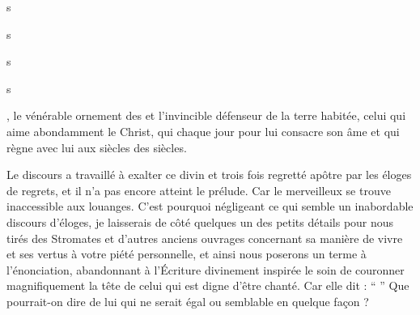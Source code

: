 



s

s



s

s

, le vénérable ornement des  et l'invincible défenseur de la terre habitée,
celui qui aime abondamment le Christ, qui  chaque jour  pour lui consacre son âme et qui règne avec lui aux siècles des siècles. %

Le discours a travaillé à exalter ce divin et trois fois regretté apôtre  par les éloges de regrets, et il n'a pas encore atteint le prélude.
Car le  merveilleux  se trouve inaccessible aux louanges. %
C'est pourquoi négligeant %
ce qui semble un inabordable discours d'éloges,
 je laisserais  de côté  quelques un des petits détails pour nous tirés des Stromates et d'autres anciens ouvrages  concernant sa manière de vivre et ses vertus  à votre piété personnelle, et ainsi nous poserons un terme à l'énonciation,
abandonnant  à l'Écriture divinement inspirée le soin de couronner magnifiquement la tête de celui qui est digne d'être chanté. %
Car elle dit : \enquote{ }
Que pourrait-on dire de lui qui ne serait égal ou semblable en quelque façon ?

\saut

